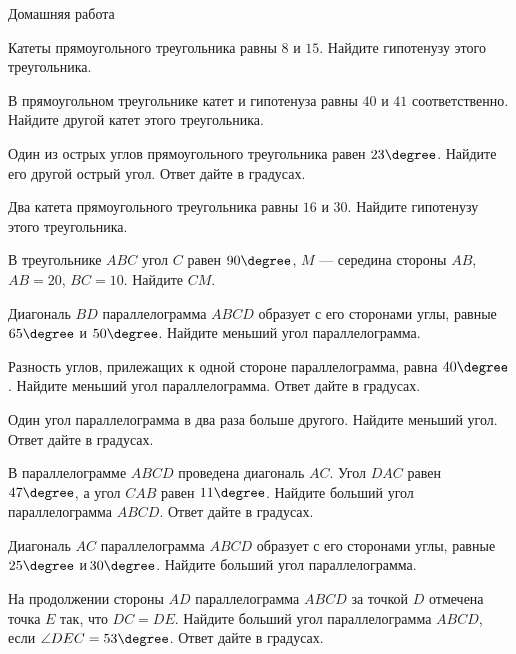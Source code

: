 \begin{homework}[number=2]
	\begin{listofex}
		\item Домашняя работа
	\end{listofex}
\end{homework}

\begin{class}[number=3]
	\begin{listofex}
		\item Катеты прямоугольного треугольника равны \( 8 \) и \( 15 \). Найдите гипотенузу этого треугольника.
		\item В прямоугольном треугольнике катет и гипотенуза равны \( 40 \) и \( 41 \) соответственно. Найдите другой катет этого треугольника.
		\item Один из острых углов прямоугольного треугольника равен \( 23\degree \). Найдите его другой острый угол. Ответ дайте в градусах.
		\item Два катета прямоугольного треугольника равны \( 16 \) и \( 30 \). Найдите гипотенузу этого треугольника.
		\item В треугольнике \( ABC \) угол \( C \) равен \( 90\degree \), \( M \) --- середина стороны \( AB \), \( AB=20 \), \( BC=10 \). Найдите \( CM \).
		\item Диагональ \( BD \) параллелограмма \( ABCD \) образует с его сторонами углы, равные \( 65\degree \) и \( 50\degree \). Найдите меньший угол параллелограмма.
		\item Разность углов, прилежащих к одной стороне параллелограмма, равна \( 40\degree \). Найдите меньший угол параллелограмма. Ответ дайте в градусах.
		\item Один угол параллелограмма в два раза больше другого. Найдите меньший угол. Ответ дайте в градусах.
		\item В параллелограмме \( ABCD \) проведена диагональ \( AC \). Угол \( DAC \) равен \( 47\degree \), а угол \( CAB \) равен \( 11\degree \). Найдите больший угол параллелограмма \( ABCD \). Ответ дайте в градусах.
		\item Диагональ \( AC \) параллелограмма \( ABCD \) образует с его сторонами углы, равные \( 25\degree \) и \( 30\degree \). Найдите больший угол параллелограмма.
		\item На продолжении стороны \( AD \) параллелограмма \( ABCD \) за точкой \( D \) отмечена точка \( E \) так, что \( DC=DE \). Найдите больший угол параллелограмма \( ABCD \), если \( \angle DEC=53\degree \). Ответ дайте в градусах.

\end{listofex}
\end{class}
